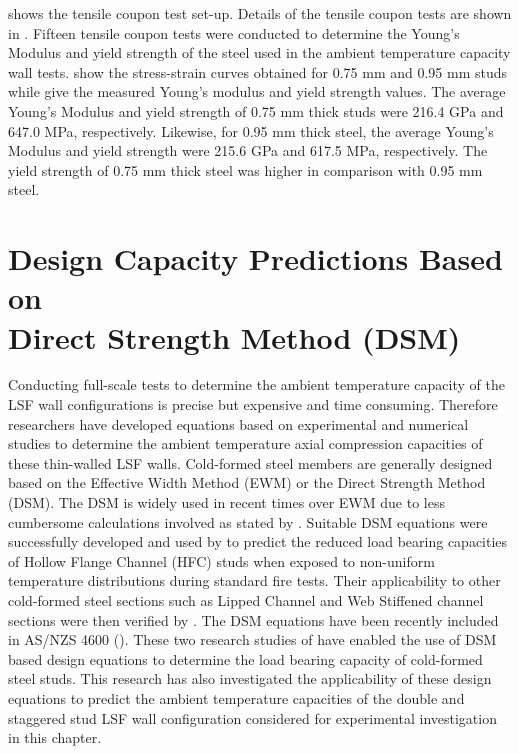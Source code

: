  shows the tensile coupon test set-up. Details of the tensile coupon tests are shown in . Fifteen tensile coupon tests were conducted to determine the Young's Modulus and yield strength of the steel used in the ambient temperature capacity wall tests.  show the stress-strain curves obtained for 0.75 mm and 0.95 mm studs while  give the measured Young's modulus and yield strength values. The average Young's Modulus and yield strength of 0.75 mm thick studs were 216.4 GPa and 647.0 MPa, respectively. Likewise, for 0.95 mm thick steel, the average Young's Modulus and yield strength were 215.6 GPa and 617.5 MPa, respectively. The yield strength of 0.75 mm thick steel was higher in comparison with 0.95 mm steel. 

\section[Design Capacity Predictions Based on Direct Strength Method (DSM)]{Design Capacity Predictions Based on \\Direct Strength Method (DSM)}

Conducting full-scale tests to determine the ambient temperature capacity of the LSF wall configurations is precise but expensive and time consuming. Therefore researchers have developed equations based on experimental and numerical studies to determine the ambient temperature axial compression capacities of these thin-walled LSF walls. Cold-formed steel members are generally designed based on the Effective Width Method (EWM) or the Direct Strength Method (DSM). The DSM is widely used in recent times over EWM due to less cumbersome calculations involved as stated by \citet{Yu2007,Schafer2008b,Shahbazian2011,Shahbazian2012}. Suitable DSM equations were successfully developed and used by \citet{Kesawan2016} to predict the reduced load bearing capacities of Hollow Flange Channel (HFC) studs when exposed to non-uniform temperature distributions during standard fire tests. Their applicability to other cold-formed steel sections such as Lipped Channel and Web Stiffened channel sections were then verified by \citet{Rusthi2018}. The DSM equations have been recently included in AS/NZS 4600 (\cite{ASNZ4600}). These two research studies of \citet{Kesawan2016,Rusthi2018} have enabled the use of DSM based design equations to determine the load bearing capacity of cold-formed steel studs. This research has also investigated the applicability of these design equations to predict the ambient temperature capacities of the double and staggered stud LSF wall configuration considered for experimental investigation in this chapter.

